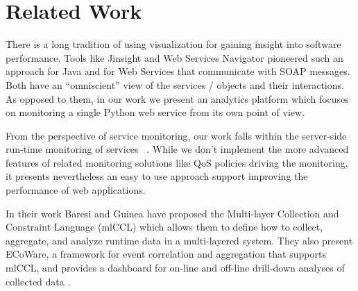
\section{Related Work}
\label{sec:related}


There is a long tradition of using visualization for gaining insight into software performance. Tools like Jinsight \cite{Pauw02a} and Web Services Navigator \cite{Pauw05} pioneered such an approach for Java and for Web Services that communicate with SOAP messages. Both have an ``omniscient'' view of the services / objects and their interactions. As opposed to them, in our work we present an analytics platform which focuses on monitoring a single Python web service from its own point of view.

From the perspective of service monitoring, our work falls within the server-side run-time monitoring of services ~\cite{ghezzi2007run}. While we don't implement the more advanced features of related monitoring solutions like QoS policies driving the monitoring, it presents nevertheless an easy to use approach support improving the performance of web applications. 

In their work Baresi and Guinea have proposed the Multi-layer Collection and Constraint Language (mlCCL) which allows them to define how to collect, aggregate, and analyze runtime data in a multi-layered system. They also present ECoWare, a framework for event correlation and aggregation that supports mlCCL, and provides a dashboard for on-line and off-line drill-down analyses of collected data \cite{Bare13-monitoring}.


